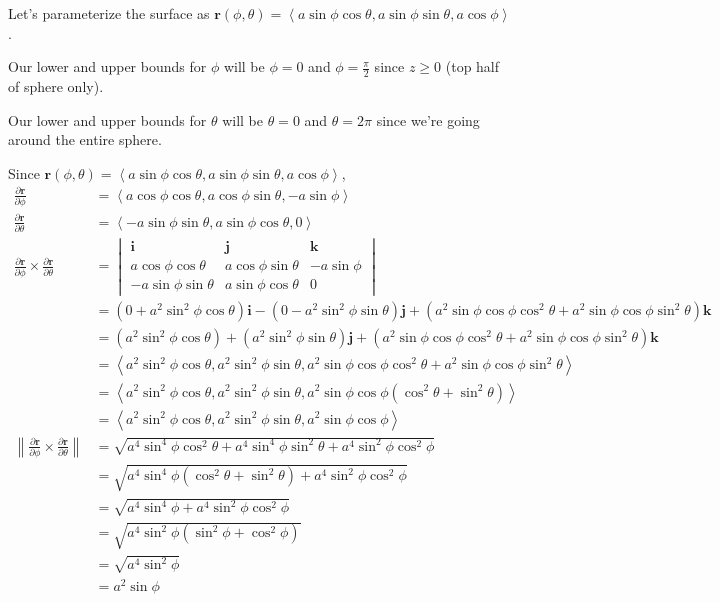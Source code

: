 \documentclass{article}
\newcommand{\lrp}[1]{\left( #1 \right)}
\newcommand{\lra}[1]{\left\langle #1 \right\rangle}
\newcommand{\norm}[1]{\left\lVert #1 \right\rVert}
\renewcommand{\i}[0]{\mathbf{i}}
\renewcommand{\j}[0]{\mathbf{j}}
\renewcommand{\k}[0]{\mathbf{k}}
\renewcommand{\r}[0]{\mathbf{r}}
\begin{document}
Let's parameterize the surface as $\r(\phi,\theta)=\lra{a\sin\phi\cos\theta, a\sin\phi\sin\theta, a\cos\phi}$.

Our lower and upper bounds for $\phi$ will be $\phi=0$ and $\displaystyle \phi = \frac{\pi}{2}$ since $z\geq 0$ (top half of sphere only).

Our lower and upper bounds for $\theta$ will be $\theta=0$ and $\theta=2\pi$ since we're going around the entire sphere.

Since $\displaystyle \r(\phi, \theta)=\lra{a\sin\phi\cos\theta,a\sin\phi\sin\theta, a\cos\phi}$,
\begin{align*}
\frac{\partial \r}{\partial \phi}&=\lra{a\cos\phi\cos\theta, a\cos\phi\sin\theta, -a\sin\phi}\\
    \frac{\partial \r}{\partial \theta}&=\lra{-a\sin\phi\sin\theta, a\sin\phi\cos\theta, 0}\\
    \frac{\partial \r}{\partial \phi}\times  \frac{\partial \r}{\partial \theta}&= \begin{vmatrix}\i &\j &\k \\ a\cos\phi\cos\theta & a\cos\phi\sin\theta & -a\sin\phi \\ -a\sin\phi\sin\theta & a\sin\phi\cos\theta & 0\end{vmatrix}\\
    &=\lrp{0 +a^2\sin^2\phi\cos\theta}\i -\lrp{0 -a^2\sin^2\phi\sin\theta}\j + \lrp{a^2\sin\phi\cos\phi\cos^2\theta+a^2\sin\phi\cos\phi\sin^2\theta}\k\\
    &=\lrp{a^2\sin^2\phi\cos\theta}+\lrp{a^2\sin^2\phi\sin\theta}\j+\lrp{a^2\sin\phi\cos\phi\cos^2\theta+a^2\sin\phi\cos\phi\sin^2\theta}\k\\
    &=\lra{a^2\sin^2\phi\cos\theta, a^2\sin^2\phi\sin\theta, a^2\sin\phi\cos\phi\cos^2\theta+a^2\sin\phi\cos\phi\sin^2\theta}\\
    &=\lra{a^2\sin^2\phi\cos\theta, a^2\sin^2\phi\sin\theta,a^2\sin\phi\cos\phi\lrp{\cos^2\theta+\sin^2\theta}}\\
    &=\lra{a^2\sin^2\phi\cos\theta, a^2\sin^2\phi\sin\theta,a^2\sin\phi\cos\phi}\tag{$\cos^2\theta+\sin^2\theta=1$}\\
    \norm{\frac{\partial \r}{\partial \phi}\times  \frac{\partial \r}{\partial \theta}}&=\sqrt{a^4\sin^4\phi\cos^2\theta+a^4\sin^4\phi\sin^2\theta+a^4\sin^2\phi\cos^2\phi}\\
    &=\sqrt{a^4\sin^4\phi\lrp{\cos^2\theta+\sin^2\theta}+a^4\sin^2\phi\cos^2\phi}\\
    &=\sqrt{a^4\sin^4\phi+a^4\sin^2\phi\cos^2\phi}\tag{$\cos^2\theta+\sin^2\theta=1$}\\
    &=\sqrt{a^4\sin^2\phi\lrp{\sin^2\phi+\cos^2\phi}}\\
    &=\sqrt{a^4\sin^2\phi}\tag{$\sin^2\phi+\cos^2\phi=1$}\\
    &=a^2\sin\phi
\end{align*}
\end{document}
